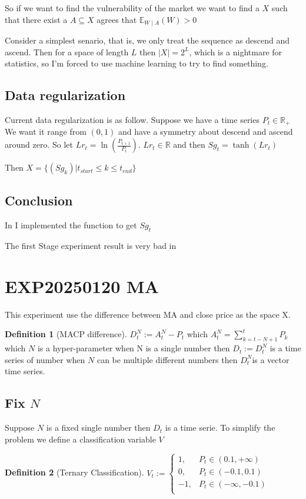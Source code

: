\documentclass{article}
\theoremstyle{definition} %
\newtheorem{definition}{Definition}[section]
\begin{document}
So if we want to find the vulnerability of
the market we want to find a $X$ such that
there exist a $A\subseteq X$ agrees that
$\mathbb{E}_{W\mid A}(W)>0$

Consider a simplest senario, that is, we only
treat the sequence as descend and ascend. Then
for a space of length $L$ then
$\left|X\right|=2^L$, which is a nightmare for
statistics, so I'm forced to use machine learning
to try to find something.

\subsection{Data regularization}
Current data regularization is as follow.
Suppose we have a time series
$P_t \in \mathbb{R}_+$
We want it range from $(0,1)$ and have a symmetry
about descend and ascend around zero.
So let $Lr_t=\ln(\frac{P_{t+1}}{P_{t}})$.
$Lr_t\in \mathbb{R}$ and then
$Sg_t=\tanh(Lr_t)$

Then $X=\{(Sg_k)|t_{start}\leq k\leq t_{end}\}$

\subsection{Conclusion}
In \cite[PrefixSequence]{EXP20250119PrefixSequence}
I implemented the function to get $Sg_t$

The first Stage experiment result is
very bad in \cite[Cov1d]{EXP20250119PrefixSequenceGPTCov1d}

\section{EXP20250120 MA}
This experiment use the difference between
MA and close price as the space X.

\begin{definition}[MACP difference]
    $D_t^N:=A_t^N-P_t$
    which
    $A_t^N=\sum_{k=t-N+1}^tP_k$
    which $N$ is a hyper-parameter
    when N is a single number then $D_t:=D_t^N$
    is a time series of number
    when $N$ can be multiple different numbers
    then $D_t^N$is a vector time series.
\end{definition}

\subsection[Fix N]{Fix $N$}
Suppose $N$ is a fixed single number then
$D_t$ is a time serie.
To simplify the problem we define a
classification variable $V$
\begin{definition}[Ternary Classification]
    $
        V_t:=
        \begin{cases}
            1,  & P_t\in\left(0.1,+\infty\right)  \\
            0,  & P_t\in\left(-0.1,0.1\right)     \\
            -1, & P_t\in\left(-\infty,-0.1\right) \\
        \end{cases}
    $
\end{definition}
\end{document}
